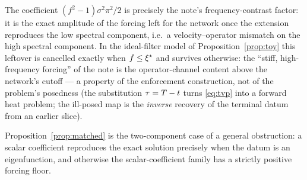 \documentclass[11pt]{article}
\theoremstyle{plain}
\theoremstyle{definition}
\theoremstyle{remark}
\begin{document}
The coefficient $(f^{2}-1)\sigma^{2}\pi^{2}/2$ is precisely the note's
frequency-contrast factor: it is the exact amplitude of the forcing left for the
network once the extension reproduces the low spectral component, i.e.\ a velocity--operator
mismatch on the high spectral component. In the ideal-filter model of
Proposition~\ref{prop:toy} this leftover is cancelled exactly when
$f\le\xi^{\star}$ and survives otherwise: the ``stiff, high-frequency
forcing'' of the note is the operator-channel content above the network's
cutoff --- a property of the enforcement construction, not of the problem's
posedness (the substitution $\tau=T-t$ turns \eqref{eq:tvp}
into a forward heat problem; the ill-posed map is the \emph{inverse} recovery of
the terminal datum from an earlier slice).

Proposition~\ref{prop:matched} is the two-component case of a general obstruction:
a scalar coefficient reproduces the exact solution precisely when the datum is
an eigenfunction, and otherwise the scalar-coefficient family has a strictly
positive forcing floor.
\end{document}
